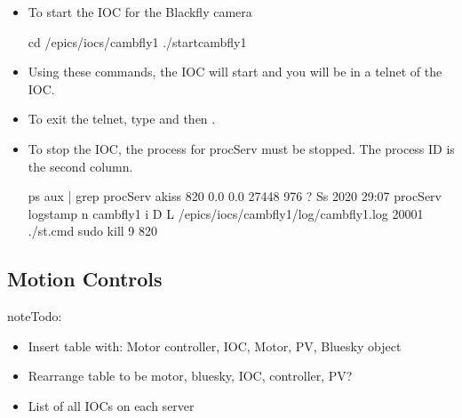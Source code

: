 \documentclass[letterpaper,10pt,english]{sphinxmanual}
\begin{document}
\begin{description}
\begin{itemize}
\item {} 
\sphinxAtStartPar
To start the IOC for the Blackfly camera

\begin{sphinxVerbatim}[commandchars=\\\{\}]
\PYGZdl{} cd /epics/iocs/cam\PYGZhy{}bfly1
\PYGZdl{} ./start\PYGZus{}cam\PYGZus{}bfly1
\end{sphinxVerbatim}

\item {} 
\sphinxAtStartPar
Using these commands, the IOC will start and you will be in a telnet of the IOC.

\item {} 
\sphinxAtStartPar
To exit the telnet, type \sphinxcode{\sphinxupquote{Ctrl+{]}}} and then .

\item {} 
\sphinxAtStartPar
To stop the IOC, the process for procServ must be stopped. The process ID is the second column.

\begin{sphinxVerbatim}[commandchars=\\\{\}]
\PYGZdl{} ps aux | grep procServ
akiss      820  0.0  0.0  27448   976 ?        Ss    2020  29:07 procServ \PYGZhy{}\PYGZhy{}logstamp \PYGZhy{}n cam\PYGZhy{}bfly1 \PYGZhy{}i \PYGZca{}D \PYGZhy{}L /epics/iocs/cam\PYGZhy{}bfly1/log/cam\PYGZhy{}bfly1.log 20001 ./st.cmd
\PYGZdl{} sudo kill \PYGZhy{}9 820
\end{sphinxVerbatim}

\end{itemize}

\end{description}


\subsection{Motion Controls}
\label{\detokenize{staff:motion-controls}}
\begin{sphinxadmonition}{note}{\label{\detokenize{staff:id5}}Todo:}\begin{itemize}
\item {} 
\sphinxAtStartPar
Insert table with: Motor controller, IOC, Motor, PV, Bluesky object

\item {} 
\sphinxAtStartPar
Rearrange table to be motor, bluesky, IOC, controller, PV?

\item {} 
\sphinxAtStartPar
List of all IOCs on each server

\end{itemize}
\end{sphinxadmonition}
\end{document}

